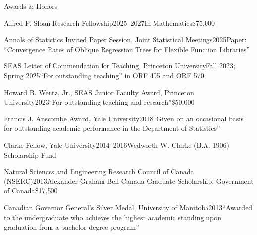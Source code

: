 \documentclass{resume}
\begin{document}
\begin{rSection}{Awards \& Honors}

\begin{rSubsection}{Alfred P. Sloan Research Fellowship}{2025--2027}{In Mathematics}{\$75,000}
\end{rSubsection}

\begin{rSubsection}{Annals of Statistics Invited Paper Session, Joint Statistical Meetings}{2025}{Paper: ``Convergence Rates of Oblique Regression Trees for Flexible Function Libraries''}{}
\end{rSubsection}

\begin{rSubsection}{SEAS Letter of Commendation for Teaching, Princeton University}{Fall 2023; Spring 2025}{``For outstanding teaching'' in ORF 405 and ORF 570}{}
\end{rSubsection}

\begin{rSubsection}{Howard B. Wentz, Jr., SEAS Junior Faculty Award, Princeton University}{2023}{``For outstanding teaching and research''}{\$50,000}
\end{rSubsection}

\begin{rSubsection}{Francis J. Anscombe Award, Yale University}{2018}{``Given on an occasional basis for outstanding academic performance in the Department of Statistics''}{}
\end{rSubsection}

\begin{rSubsection}{Clarke Fellow, Yale University}{2014--2016}{Wedworth W. Clarke (B.A. 1906) Scholarship Fund}{}
\end{rSubsection}

\begin{rSubsection}{Natural Sciences and Engineering Research Council of Canada (NSERC)}{2013}{Alexander Graham Bell Canada Graduate Scholarship, Government of Canada}{\$17,500}
\end{rSubsection}

\begin{rSubsection}{Canadian Governor General's Silver Medal, University of Manitoba}{2013}{``Awarded to the undergraduate who achieves the highest academic standing upon graduation from a bachelor degree program''}{}
\end{rSubsection}
\end{rSection}
\end{document}
